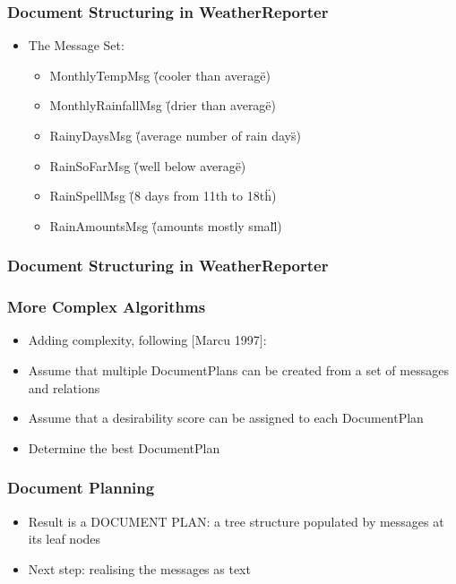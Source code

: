 \documentclass[compress,color=usenames]{beamer}
\begin{document}
\begin{frame}
\frametitle{Document Structuring in WeatherReporter}

\label{f176}
\begin{itemize}
\item { {The Message Set:}}

\begin{itemize}
\item MonthlyTempMsg (\"{}cooler than average\"{})
\item MonthlyRainfallMsg (\"{}drier than average\"{})
\item RainyDaysMsg (\"{}average number of rain days\"{})
\item RainSoFarMsg (\"{}well below average\"{})
\item RainSpellMsg (\"{}8 days from 11th to 18th\"{})
\item RainAmountsMsg (\"{}amounts mostly small\"{})
\end{itemize}
\end{itemize}
 
\end{frame}

\begin{frame}
\frametitle{Document Structuring in WeatherReporter}

\label{f178}
 
\end{frame}

\begin{frame}
\frametitle{More Complex Algorithms}

\label{f180}
\begin{itemize}
\item { {Adding complexity, following \mbox{$[$}Marcu 1997\mbox{$]$}:}}
\item { {Assume that multiple DocumentPlans can be created from a set of messages and relations}}
\item { {Assume that a desirability score can be assigned to each DocumentPlan}}
\item { {Determine the best DocumentPlan}}
\end{itemize}
 
\end{frame}

\begin{frame}
\frametitle{Document Planning}

\label{f182}
\begin{itemize}
\item { {Result is a DOCUMENT PLAN: a tree structure populated by messages at its leaf nodes}}
\item { {Next step: realising the messages as text}}
\end{itemize}
 
\end{frame}
\end{document}
